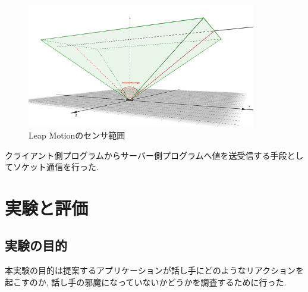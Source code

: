 \documentclass{funthesis}
\begin{document}
 \begin{figure}[H]
 \begin{center}
  \includegraphics[width=100mm]{./img/LeapAngle.png}
 \end{center}
 \caption{Leap Motionのセンサ範囲}
 \label{leap}
\end{figure}



クライアント側プログラムからサーバー側プログラムへ値を送受信する手段としてソケット通信を行った. 



\chapter{実験と評価}

\section{実験の目的}
本実験の目的は提案するアプリケーションが話し手にどのようなリアクションを起こすのか, 話し手の邪魔になっていないかどうかを調査するために行った. 
\end{document}
